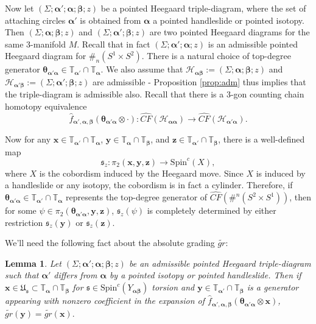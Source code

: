 \documentclass[11pt]{article}
\theoremstyle{plain} \newtheorem{thm}{Theorem}[subsection]
\theoremstyle{plain} \newtheorem{cor}[thm]{Corollary}
\theoremstyle{plain} \newtheorem{prop}[thm]{Proposition}
\theoremstyle{plain} \newtheorem{conj}[thm]{Conjecture}
\theoremstyle{plain} \newtheorem{lem}[thm]{Lemma}
\theoremstyle{definition} \newtheorem{df}[thm]{Definition}
\theoremstyle{remark} \newtheorem{rmk}[thm]{Remark}
\theoremstyle{remark} \newtheorem{obs}[thm]{Observation}
\newcommand{\SxS}{S^{2}\times S^{1}}
\newcommand{\h}{\mathcal{H}}
\newcommand{\tld}[1]{\widetilde{#1}}
\newcommand{\Us}{\mathfrak{U}_{\mathfrak{s}}}
\newcommand{\sz}[1]{\mathfrak{s}_{z}\left( #1 \right)}
\newcommand{\ba}{\boldsymbol{\alpha}}
\newcommand{\bb}{\boldsymbol{\beta}}
\newcommand{\Ta}{\mathbb{T}_{\ba}}
\newcommand{\Tb}{\mathbb{T}_{\bb}}
\newcommand{\Tap}{\tor{\ba'}}
\newcommand{\bx}{\mathbf{x}}
\newcommand{\by}{\mathbf{y}}
\newcommand{\bz}{\mathbf{z}}
\newcommand{\Yab}{Y_{\ba\bb}}
\newcommand{\thet}[1]{\boldsymbol{\theta}_{#1}}
\newcommand{\tor}[1]{\mathbb{T}_{#1}}
\begin{document}
Now let $\left(\Sigma; \ba'; \ba; \bb; z\right)$ be a pointed Heegaard triple-diagram, where the set of attaching circles $\ba'$ is obtained from $\ba$ a pointed handleslide or pointed isotopy.  Then $\left(\Sigma; \ba; \bb; z\right)$ and $\left(\Sigma; \ba'; \bb; z\right)$ are two pointed Heegaard diagrams for the same 3-manifold $M$.  Recall that in fact $\left(\Sigma; \ba'; \ba; z\right)$ is an admissible pointed Heegaard diagram for $\#_{n}(S^{1} \times S^{2})$.  There is a natural choice of top-degree generator $\thet{\ba'\ba} \in \tor{\ba'} \cap \tor{\ba}$.    We also assume that $\h_{\ba \bb} := \left( \Sigma; \ba; \bb; z \right)$ and $\h_{\ba' \bb} := \left( \Sigma; \ba'; \bb; z \right)$ are admissible - Proposition \ref{prop:adm} thus implies that the triple-diagram is admissible also.  Recall that there is a 3-gon counting chain homotopy equivalence
$$\widehat{f}_{\ba', \ba,\bb}(\thet{\ba'\ba} \otimes \cdot): \widehat{CF} \left( \h_{\ba \ba} \right) \rightarrow\widehat{CF} \left( \h_{\ba' \ba} \right).$$

Now for any $\bx \in \Tap \cap \Ta$, $\by \in \Ta \cap \Tb$, and $\bz \in \Tap \cap \Tb$, there is a well-defined map
\begin{equation*}
\mathfrak{s}_{z}: \pi_{2}\left( \bx, \by, \bz \right) \rightarrow \text{Spin}^{c}(X),
\end{equation*}
where $X$ is the cobordism induced by the Heegaard move.  Since $X$ is induced by a handleslide or any isotopy, the cobordism is in fact a cylinder.  Therefore, if $\thet{\ba'\ba} \in \Tap \cap \Ta$ represents the top-degree generator of $\widehat{CF}(\#^{n}(\SxS))$, then for some $\psi \in \pi_{2}\left( \thet{\ba'\ba}, \by, \bz \right)$, $\mathfrak{s}_{z}(\psi)$ is completely determined by either restriction $\sz{\by}$ or $\sz{\bz}$.

We'll need the following fact about the absolute grading $\tld{gr}$:

\begin{lem}\label{lem:gr}
Let $\left( \Sigma; \ba'; \ba; \bb; z \right)$ be an admissible pointed Heegaard triple-diagram such that $\ba'$ differs from $\ba$ by a pointed isotopy or pointed handleslide.  Then if $\bx \in \Us \subset \tor{\ba} \cap \tor{\bb}$ for $\mathfrak{s} \in \text{Spin}^{c} \left( \Yab \right) $ torsion and $\by \in \tor{\ba'} \cap \tor{\bb}$ is a generator appearing with nonzero coefficient in the expansion of $\widehat{f}_{\ba', \ba,\bb}(\thet{\ba'\ba} \otimes \bx)$, $\tld{gr}(\by) = \tld{gr}(\bx).$
\end{lem}
\end{document}
